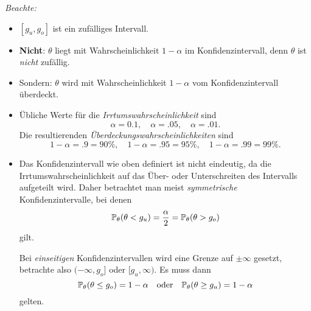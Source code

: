 \emph{Beachte:}
\begin{itemize}
\item $[g_u, g_o]$ ist ein zufälliges Intervall.
\item \textbf{Nicht}: $\theta$ liegt mit Wahrscheinlichkeit $1-\alpha$ im
  Konfidenzintervall, denn $\theta$ ist \emph{nicht} zufällig.
\item Sondern: $\theta$ wird mit Wahrscheinlichkeit $1-\alpha$ vom
  Konfidenzintervall überdeckt.
\item Übliche Werte für die \emph{Irrtumswahrscheinlichkeit} sind
  \[ \alpha = \num{0.1}, \quad
    \alpha = \num{.05}, \quad
    \alpha = \num{.01}. \]
  Die resultierenden \emph{Überdeckungswahrscheinlichkeiten} sind
  \[ 1 - \alpha = \num{.9} = 90 \%, \quad
    1 - \alpha = \num{.95} = 95 \%, \quad 
    1 - \alpha = \num{.99} = 99 \%. \]
\item Das Konfidenzintervall wie oben definiert ist nicht eindeutig, da die
  Irrtumswahrscheinlichkeit auf das Über- oder Unterschreiten des Intervalls
  aufgeteilt wird. Daher betrachtet man meist \emph{symmetrische}
  Konfidenzintervalle, bei denen
  \[ \mathbb{P}_\theta( \theta < g_u ) = \frac{\alpha}{2}
    = \mathbb{P}_\theta( \theta > g_o ) \]
  gilt.

  Bei \emph{einseitigen} Konfidenzintervallen wird eine Grenze auf $\pm \infty$
  gesetzt, betrachte also $(-\infty, g_o]$ oder $[g_u,\infty)$. Es muss dann
  \[ \mathbb{P}_\theta( \theta \le g_o ) = 1-\alpha \quad \text{oder} \quad
    \mathbb{P}_\theta(\theta \ge g_u) = 1-\alpha \]
  gelten.
\end{itemize}

